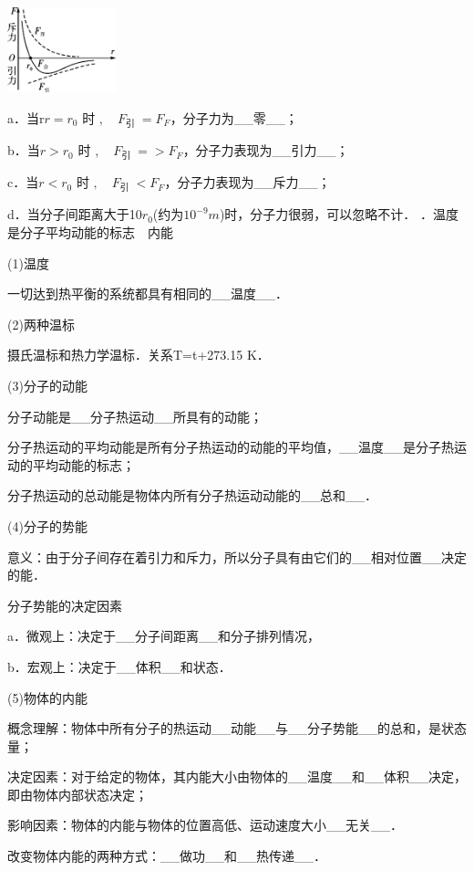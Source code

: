 \begin{center}\includegraphics[width=1.23611in,height=0.97153in]{media/image485.png}\end{center}

a．当r$r=r_{0}$ 时 $, \quad F_{\text {引 }}=F_{F}$，分子力为\_\_零\_\_；

b．当$r>r_{0}$ 时 $, \quad F_{\text {引 }}=>F_{F}$，分子力表现为\_\_引力\_\_；

c．当$r<r_{0}$ 时 $, \quad F_{\text {引 }}<F_{F}$，分子力表现为\_\_斥力\_\_；

d．当分子间距离大于10$r_0$(约为$10^{-9} m$)时，分子力很弱，可以忽略不计．
．温度是分子平均动能的标志　内能

(1)温度

一切达到热平衡的系统都具有相同的\_\_温度\_\_．

(2)两种温标

摄氏温标和热力学温标．关系T=t+273.15 K．

(3)分子的动能

分子动能是\_\_分子热运动\_\_所具有的动能；

分子热运动的平均动能是所有分子热运动的动能的平均值，\_\_温度\_\_是分子热运动的平均动能的标志；

分子热运动的总动能是物体内所有分子热运动动能的\_\_总和\_\_．

(4)分子的势能

意义：由于分子间存在着引力和斥力，所以分子具有由它们的\_\_相对位置\_\_决定的能．

分子势能的决定因素

a．微观上：决定于\_\_分子间距离\_\_和分子排列情况，

b．宏观上：决定于\_\_体积\_\_和状态．

(5)物体的内能

概念理解：物体中所有分子的热运动\_\_动能\_\_与\_\_分子势能\_\_的总和，是状态量；

决定因素：对于给定的物体，其内能大小由物体的\_\_温度\_\_和\_\_体积\_\_决定，即由物体内部状态决定；

影响因素：物体的内能与物体的位置高低、运动速度大小\_\_无关\_\_．

改变物体内能的两种方式：\_\_做功\_\_和\_\_热传递\_\_．

